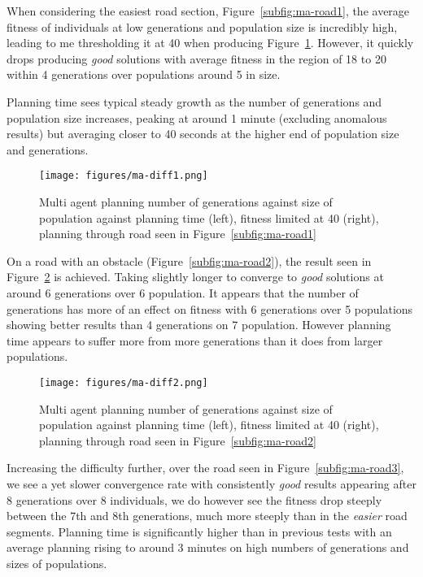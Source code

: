 When considering the easiest road section, Figure~\ref{subfig:ma-road1}, the average fitness of individuals at low generations and population size is incredibly high, leading to me thresholding it at 40 when producing Figure~\ref{fig:ma-diff1-lim40}. However, it quickly drops producing \textit{good} solutions with average fitness in the region of 18 to 20 within 4 generations over populations around 5 in size.

Planning time sees typical steady growth as the number of generations and population size increases, peaking at around 1 minute (excluding anomalous results) but averaging closer to 40 seconds at the higher end of population size and generations.

\begin{figure}[ht]
  \centering
  \texttt{[image: figures/ma-diff1.png]}
  \caption{\label{fig:ma-diff1-lim40} Multi agent planning number of generations against size of population against planning time (left), fitness limited at 40 (right), planning through road seen in Figure~\ref{subfig:ma-road1}}
\end{figure}

On a road with an obstacle (Figure~\ref{subfig:ma-road2}), the result seen in Figure~\ref{fig:ma-diff2-lim40} is achieved. Taking slightly longer to converge to \textit{good} solutions at around 6 generations over 6 population. It appears that the number of generations has more of an effect on fitness with 6 generations over 5 populations showing better results than 4 generations on 7 population. However planning time appears to suffer more from more generations than it does from larger populations.

\begin{figure}[ht]
  \centering
  \texttt{[image: figures/ma-diff2.png]}
  \caption{\label{fig:ma-diff2-lim40} Multi agent planning number of generations against size of population against planning time (left), fitness limited at 40 (right), planning through road seen in Figure~\ref{subfig:ma-road2}}
\end{figure}


Increasing the difficulty further, over the road seen in Figure~\ref{subfig:ma-road3}, we see a yet slower convergence rate with consistently \textit{good} results appearing after 8 generations over 8 individuals, we do however see the fitness drop steeply between the 7th and 8th generations, much more steeply than in the \textit{easier} road segments. Planning time is significantly higher than in previous tests with an average planning rising to around 3 minutes on high numbers of generations and sizes of populations.

